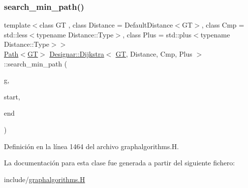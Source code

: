 \subsubsection{\texorpdfstring{search\+\_\+min\+\_\+path()}{search\_min\_path()}}
{\footnotesize\ttfamily template$<$class GT , class Distance  = Default\+Distance$<$\+G\+T$>$, class Cmp  = std\+::less$<$typename Distance\+::\+Type$>$, class Plus  = std\+::plus$<$typename Distance\+::\+Type$>$$>$ \\
\hyperlink{class_designar_1_1_path}{Path}$<$\hyperlink{demo-buildgraph_8_c_a3001c40d2c31ca87ed96cd7d1334a55e}{GT}$>$ \hyperlink{class_designar_1_1_dijkstra}{Designar\+::\+Dijkstra}$<$ \hyperlink{demo-buildgraph_8_c_a3001c40d2c31ca87ed96cd7d1334a55e}{GT}, Distance, Cmp, Plus $>$\+::search\+\_\+min\+\_\+path (\begin{DoxyParamCaption}\item[{\hyperlink{demo-buildgraph_8_c_a3001c40d2c31ca87ed96cd7d1334a55e}{GT} \&}]{g,  }\item[{\hyperlink{class_designar_1_1_dijkstra_afeb644fc5395569ec366f0d220ab477d}{Node} \&}]{start,  }\item[{\hyperlink{class_designar_1_1_dijkstra_afeb644fc5395569ec366f0d220ab477d}{Node} \&}]{end }\end{DoxyParamCaption})\hspace{0.3cm}{\ttfamily [inline]}}



Definición en la línea 1464 del archivo graphalgorithms.\+H.



La documentación para esta clase fue generada a partir del siguiente fichero\+:\begin{DoxyCompactItemize}
\item 
include/\hyperlink{graphalgorithms_8_h}{graphalgorithms.\+H}\end{DoxyCompactItemize}
